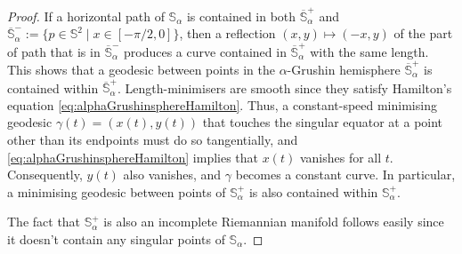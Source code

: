 \documentclass[11pt,twoside,a4paper]{article}
\newcommand{\red}{\color{red}}
\newcommand{\Sbb}{\mathbb{S}}
\renewcommand{\S}{\mathbb{S}}
\renewcommand{\phi}{\varphi}
\theoremstyle{theorem}
\newtheorem{prop}[theorem]{Proposition}
\theoremstyle{definition}
\theoremstyle{remark}
\theoremstyle{proof}
\begin{document}
\begin{proof}
If a horizontal path of $\Sbb_\alpha$ is contained in both $\overline{\S}^+_\alpha$ and $\overline{\S}^-_\alpha := \{ p \in \S^2 \mid x \in [-\pi/2,0] \}$,
then a reflection $(x, y) \mapsto (-x,y)$ of the part of path that is in $\overline{\S}^-_\alpha$ produces a curve contained in $\overline{\S}^+_\alpha$ with the same length. This shows that a geodesic between points in the $\alpha$-Grushin hemisphere $\overline{\S}^+_\alpha$ is contained within $\overline{\S}^+_\alpha$. Length-minimisers are smooth since they satisfy Hamilton's equation \cref{eq:alphaGrushinsphereHamilton}. Thus, a constant-speed minimising geodesic $\gamma(t) = (x(t), y(t))$ that touches the singular equator at a point other than its endpoints must do so tangentially, and \cref{eq:alphaGrushinsphereHamilton} implies that $x(t)$ vanishes for all $t$. Consequently, $y(t)$ also vanishes, and $\gamma$ becomes a constant curve. In particular, a minimising geodesic between points of $\S_\alpha^+$ is also contained within $\S_\alpha^+$.

The fact that $\S_\alpha^+$ is also an incomplete Riemannian manifold follows easily since it doesn't contain any singular points of $\S_\alpha$.
\end{proof}





\end{document}

